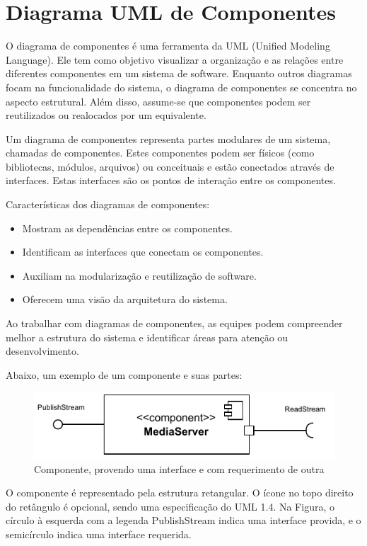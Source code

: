 \documentclass[12pt, %
openright, 
oneside, %
a4paper,    %
brazil]{facom-ufu-abntex2}
\begin{document}
\section{Diagrama UML de Componentes}

O diagrama de componentes é uma ferramenta da UML (Unified Modeling Language).
Ele tem como objetivo visualizar a organização e as relações entre diferentes
componentes em um sistema de software. Enquanto outros diagramas focam na
funcionalidade do sistema, o diagrama de componentes se concentra no aspecto
estrutural. Além disso, assume-se que componentes podem ser reutilizados ou
realocados por um equivalente. \cite{UMLComponentDiagrams2023}

Um diagrama de componentes representa partes modulares de um sistema, chamadas
de componentes. Estes componentes podem ser físicos (como bibliotecas, módulos,
arquivos) ou conceituais e estão conectados através de interfaces. Estas
interfaces são os pontos de interação entre os componentes.

Características dos diagramas de componentes:
\begin{itemize}
	\item Mostram as dependências entre os componentes.
	\item Identificam as interfaces que conectam os componentes.
	\item Auxiliam na modularização e reutilização de software.
	\item Oferecem uma visão da arquitetura do sistema.
\end{itemize}

Ao trabalhar com diagramas de componentes, as equipes podem compreender melhor
a estrutura do sistema e identificar áreas para atenção ou desenvolvimento.

Abaixo, um exemplo de um componente e suas partes:

\begin{figure}[!ht]
	\centering
	\includegraphics[width=0.8\linewidth]{example_diagram.pdf}
	\caption[Componente de exemplo]{Componente, provendo uma interface e
		com requerimento de outra}
	\label{fig:graficosVariandoTamanhoRede}
\end{figure}

O componente é representado pela estrutura retangular. O ícone no topo direito
do retângulo é opcional, sendo uma especificação do UML 1.4. Na Figura, o
círculo à esquerda com a legenda PublishStream indica uma interface provida, e
o semicírculo indica uma interface requerida.
\end{document}
